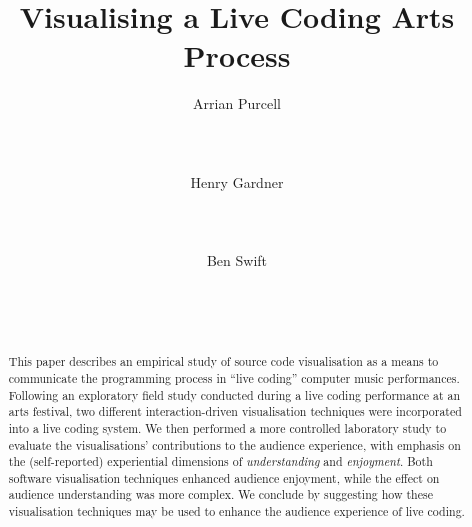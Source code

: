 \documentclass{sig-alternate}
\begin{document}

\title{Visualising a Live Coding Arts Process}

\author{
\alignauthor Arrian Purcell\\
       \\
       \\
       \\
\alignauthor Henry Gardner\\
       \\
       \\
       \\
\alignauthor Ben Swift\\
       \\
       \\
       \\
}

\maketitle
\begin{abstract}
  This paper describes an empirical study of source code visualisation
  as a means to communicate the programming process in ``live coding''
  computer music performances. Following an exploratory field study
  conducted during a live coding performance at an arts festival, two
  different interaction-driven visualisation techniques were
  incorporated into a live coding system. We then performed a more
  controlled laboratory study to evaluate the visualisations'
  contributions to the audience experience, with emphasis on the
  (self-reported) experiential dimensions of \emph{understanding} and
  \emph{enjoyment}. Both software visualisation techniques enhanced
  audience enjoyment, while the effect on audience understanding was
  more complex. We conclude by suggesting how these visualisation
  techniques may be used to enhance the audience experience of live
  coding.
\end{abstract}

\end{document}
